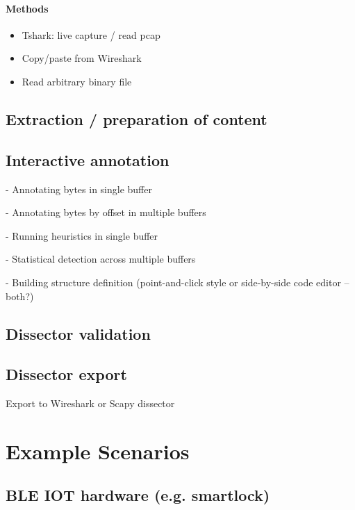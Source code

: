 \paragraph{Methods}

\begin{itemize}
\item Tshark: live capture / read pcap

\item Copy/paste from Wireshark

\item Read arbitrary binary file
\end{itemize}


\subsection{Extraction / preparation of content}




\subsection{Interactive annotation}

- Annotating bytes in single buffer

- Annotating bytes by offset in multiple buffers

- Running heuristics in single buffer

- Statistical detection across multiple buffers

- Building structure definition (point-and-click style or side-by-side code editor -- both?)


\subsection{Dissector validation}


\subsection{Dissector export}
Export to Wireshark or Scapy dissector



\section{Example Scenarios}

\subsection{BLE IOT hardware (e.g. smartlock)}

